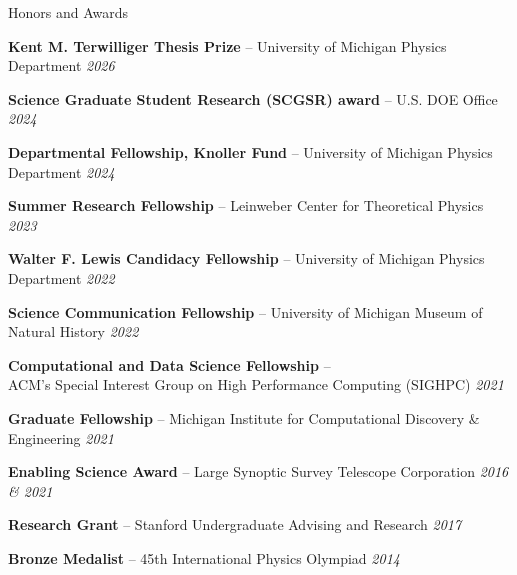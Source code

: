 \documentclass{resume} %
\begin{document}
\begin{rSection}{Honors and Awards} \itemsep -3pt \vspace*{-.25cm}

\item \textbf{Kent M. Terwilliger Thesis Prize} -- University of Michigan Physics Department \hfill{\em 2026}

\item \textbf{Science Graduate Student Research (SCGSR) award} -- U.S. DOE Office \hfill{\em 2024}

\item \textbf{Departmental Fellowship, Knoller Fund} -- University of Michigan Physics Department \hfill{\em 2024}

\item \textbf{Summer Research Fellowship} -- Leinweber Center for Theoretical Physics \hfill{\em 2023}

\item \textbf{Walter F. Lewis Candidacy Fellowship} -- University of Michigan Physics Department \hfill{\em 2022}

\item \textbf{Science Communication Fellowship} -- University of Michigan Museum of Natural History \hfill{\em 2022}

\item \textbf{Computational and Data Science Fellowship} -- \\ ACM’s Special Interest Group on High Performance Computing (SIGHPC) \hfill {\em 2021}

\item \textbf{Graduate Fellowship} -- Michigan Institute for Computational Discovery \& Engineering  \hfill {\em 2021}

\item \textbf{Enabling Science Award} -- Large Synoptic Survey Telescope Corporation \hfill {\em 2016 \& 2021}

\item \textbf{Research Grant} -- Stanford Undergraduate Advising and Research \hfill {\em 2017}

\item \textbf{Bronze Medalist} -- 45th International Physics Olympiad \hfill {\em 2014}
\end{rSection}
\end{document}
